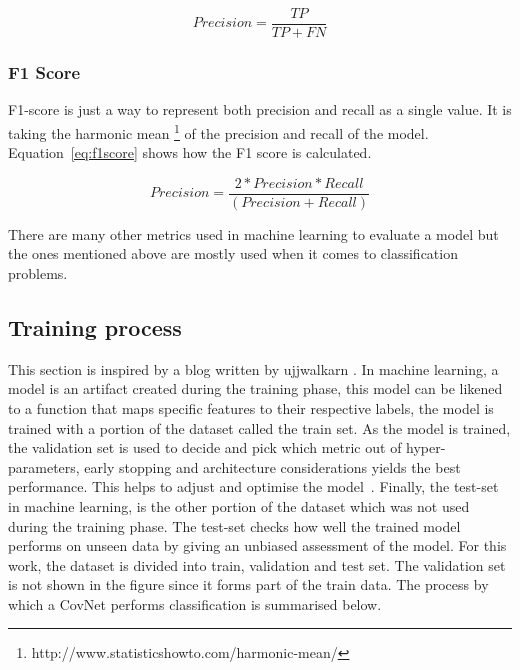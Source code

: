 \documentclass[12pt, a4paper,oneside]{report}
\begin{document}
\begin{equation}
Precision = \frac{TP}{TP + FN} \label{eq:recall}
\end{equation}

\subsubsection{F1 Score}
F1-score is just a way to represent both precision and recall as a single value. It is taking the harmonic mean \footnote{http://www.statisticshowto.com/harmonic-mean/} of the precision and recall of the model. Equation~\ref{eq:f1score} shows how the F1 score is calculated.

\begin{equation}
Precision = \frac{2 * Precision * Recall}{(Precision + Recall)} \label{eq:f1score}
\end{equation}

There are many other metrics used in machine learning to evaluate a model but the ones mentioned above are mostly used when it comes to classification problems.



\subsection{Training process}
This section is inspired by a blog written by ujjwalkarn \cite{cnnonline}. In machine learning, a model is an artifact created during the training phase, this model can be likened to a function that maps specific features to their respective labels, the model is trained with a portion of the dataset called the train set. As the model is trained, the validation set is used to decide and pick which metric out of hyper-parameters, early stopping and architecture considerations yields the best performance. This helps to adjust and optimise the model~\cite{validation}. Finally, the test-set in machine learning, is the other portion of the dataset which was not used during the training phase. The test-set checks how well the trained model performs on unseen data by giving an unbiased assessment of the model. For this work, the dataset is divided into train, validation and test set. The validation set is not shown in the figure since it forms part of the train data.
The process by which a CovNet performs classification is summarised below.
\end{document}
